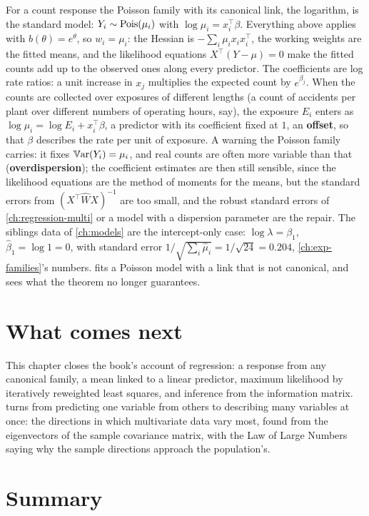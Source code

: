 For a count response the Poisson family with its canonical link, the logarithm, is the standard model: $Y_i \sim \text{Pois}(\mu_i)$ with $\log\mu_i = x_i^\top\beta$.
Everything above applies with $b(\theta) = e^\theta$, so $w_i = \mu_i$: the Hessian is $-\sum_i\mu_ix_ix_i^\top$, the working weights are the fitted means, and the likelihood equations $X^\top(Y - \mu) = 0$ make the fitted counts add up to the observed ones along every predictor.
The coefficients are log rate ratios: a unit increase in $x_j$ multiplies the expected count by $e^{\beta_j}$.
When the counts are collected over exposures of different lengths (a count of accidents per plant over different numbers of operating hours, say), the exposure $E_i$ enters as $\log\mu_i = \log E_i + x_i^\top\beta$, a predictor with its coefficient fixed at $1$, an \textbf{offset}, so that $\beta$ describes the rate per unit of exposure.
A warning the Poisson family carries: it fixes $\operatorname*{\mathbb{V}\text{ar}}(Y_i) = \mu_i$, and real counts are often more variable than that (\textbf{overdispersion}); the coefficient estimates are then still sensible, since the likelihood equations are the method of moments for the means, but the standard errors from $(X^\top\hat{W}X)^{-1}$ are too small, and the robust standard errors of \cref{ch:regression-multi} or a model with a dispersion parameter are the repair.
The siblings data of \cref{ch:models} are the intercept-only case: $\log\lambda = \beta_1$, $\hat{\beta}_1 = \log 1 = 0$, with standard error $1/\sqrt{\sum_i\hat{\mu}_i} = 1/\sqrt{24} = 0.204$, \cref{ch:exp-families}'s numbers.
 fits a Poisson model with a link that is not canonical, and sees what the theorem no longer guarantees.

\section{What comes next}
\label{sec:glm-next}

This chapter closes the book's account of regression: a response from any canonical family, a mean linked to a linear predictor, maximum likelihood by iteratively reweighted least squares, and inference from the information matrix.
 turns from predicting one variable from others to describing many variables at once: the directions in which multivariate data vary most, found from the eigenvectors of the sample covariance matrix, with the Law of Large Numbers saying why the sample directions approach the population's.

\section{Summary}
\label{sec:glm-summary}

